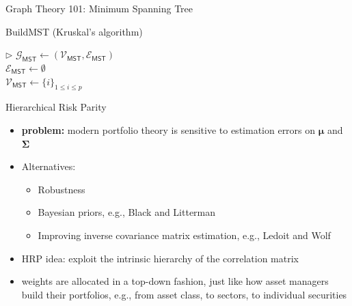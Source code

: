 \documentclass[aspectratio=169]{beamer}
\begin{document}
\begin{frame}{Graph Theory 101: Minimum Spanning Tree}
  \vspace{.5cm}
\begin{algorithm}[H]
  \caption{BuildMST (Kruskal's algorithm)}
    \SetAlgoLined
    $\triangleright$  $\mathcal{G}_{\mathsf{MST}} \leftarrow (\mathcal{V}_{\mathsf{MST}}, \mathcal{E}_{\mathsf{MST}})$ \\
    $\mathcal{E}_{\mathsf{MST}} \leftarrow \emptyset$\\
    $\mathcal{V}_{\mathsf{MST}} \leftarrow \{i\}_{1 \leq i \leq p}$\\
\end{algorithm}
\end{frame}

\begin{frame}{Hierarchical Risk Parity}
  \vspace{.5cm}
  \begin{itemize}
    \item \textbf{problem:} modern portfolio theory is sensitive to estimation errors on $\boldsymbol\mu$ and $\boldsymbol\Sigma$
  \end{itemize}
  \pause
  \begin{itemize}
  \pause
    \item Alternatives:
      \begin{itemize}
        \item Robustness
  \pause
        \item Bayesian priors, e.g., Black and Litterman
  \pause
        \item Improving inverse covariance matrix estimation, e.g., Ledoit and Wolf
      \end{itemize}
  \end{itemize}
  \pause
  \begin{itemize}
    \item HRP idea: exploit the intrinsic hierarchy of the correlation matrix
  \pause
    \item weights are allocated in a top-down fashion, just like how asset managers build their portfolios, e.g., from asset class, to sectors, to individual securities
  \end{itemize}
\end{frame}
\end{document}
